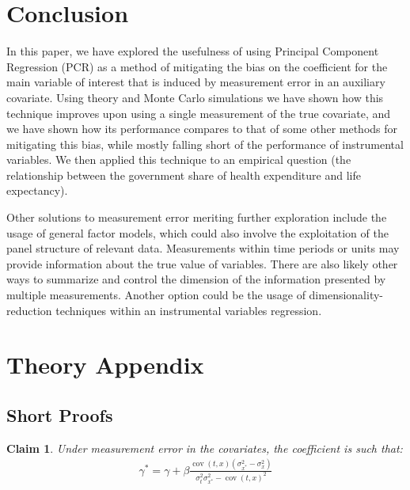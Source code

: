 \documentclass[10pt]{article}
\newtheorem{claim}{Claim}
\begin{document}
    \section*{Conclusion}
        
        In this paper, we have explored the usefulness of using Principal Component Regression (PCR) as a method of mitigating the bias on the coefficient for the main variable of interest that is induced by measurement error in an auxiliary covariate. Using theory and Monte Carlo simulations we have shown how this technique improves upon using a single measurement of the true covariate, and we have shown how its performance compares to that of some other methods for mitigating this bias, while mostly falling short of the performance of instrumental variables. We then applied this technique to an empirical question (the relationship between the government share of health expenditure and life expectancy).

        Other solutions to measurement error meriting further exploration include the usage of general factor models, which could also involve the exploitation of the panel structure of relevant data. Measurements within time periods or units may provide information about the true value of variables. There are also likely other ways to summarize and control the dimension of the information presented by multiple measurements. Another option could be the usage of dimensionality-reduction techniques within an instrumental variables regression.

    \clearpage \newpage

    
    

    \clearpage \newpage

    \appendix

	\section*{Theory Appendix}
	\subsection*{Short Proofs}

        \setcounter{claim}{0}
        \setcounter{claimproof}{0}

            \begin{claim} \label{claim_one_with_proof}
            Under measurement error in the covariates, the coefficient is such that:
            \begin{align*}
                    \gamma^* = \gamma + \beta\frac{\operatorname{cov}(t,x)(\sigma^2_{x^*}-\sigma^2_x)}{\sigma_{t}^2\sigma_{x^*}^2-\operatorname{cov}({t,x})^2}
                \end{align*}
            \end{claim}
            
\end{document}
